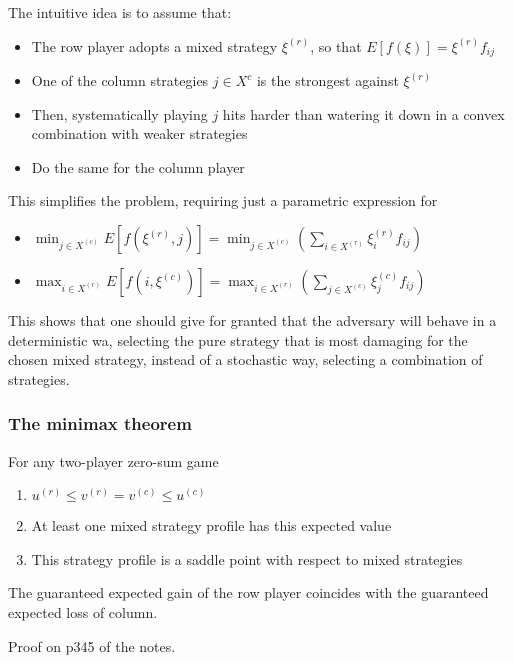 The intuitive idea is to assume that:
\begin{itemize}
	\item The row player adopts a mixed strategy $\xi^{(r)}$, so that $E\left[f(\xi)\right] = \xi^{(r)} f_{ij}$
	
	\item One of the column strategies $j \in X^c$ is the strongest against $\xi^{(r)}$
	
	\item Then, systematically playing $j$ hits harder than watering it down in a convex combination with weaker strategies
	
	\item Do the same for the column player
\end{itemize}

This simplifies the problem, requiring just a parametric expression for
\begin{itemize}
	\item $\min_{j \in X^{(c)}} E \left[f(\xi^{(r)}, j)\right] = \min_{j \in X^{(c)}} \left(\sum_{i \in X^{(r)}} \xi^{(r)}_i f_{ij} \right)$
	
	\item $\max_{i \in X^{(r)}} E \left[f(i, \xi^{(c)})\right] = \max_{i \in X^{(r)}} \left(\sum_{j \in X^{(c)}} \xi^{(c)}_j f_{ij}\right)$
\end{itemize}

This shows that one should give for granted that the adversary will behave in a deterministic wa, selecting the pure strategy that is most damaging for the chosen mixed strategy, instead of a stochastic way, selecting a combination of strategies. 

\subsubsection{The minimax theorem}

\begin{theo}
	For any two-player zero-sum game
	\begin{enumerate}
		\item $u^{(r)} \leq v^{(r)} = v^{(c)} \leq u^{(c)}$
		
		\item At least one mixed strategy profile has this expected value
		
		\item This strategy profile is a saddle point with respect to mixed strategies
	\end{enumerate}
\end{theo}

The guaranteed expected gain of the row player coincides with the guaranteed expected loss of column.

Proof on p345 of the notes.

